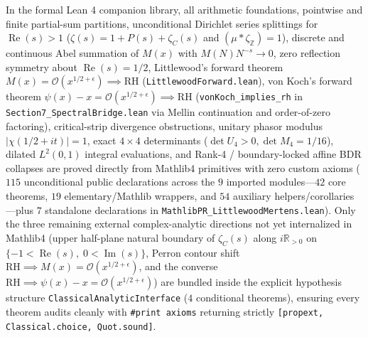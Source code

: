 \begin{remark}
\label{rem:lean_classical_interface}
\leanok
In the formal Lean 4 companion library, all arithmetic foundations, pointwise and finite partial-sum partitions, unconditional Dirichlet series splittings for $\operatorname{Re}(s) > 1$ ($\zeta(s) = 1 + P(s) + \zeta_C(s)$ and $(\mu * \zeta_{\mathbb{Z}}) = 1$), discrete and continuous Abel summation of $M(x)$ with $M(N)N^{-s} \to 0$, zero reflection symmetry about $\operatorname{Re}(s) = 1/2$, Littlewood's forward theorem $M(x) = \mathcal{O}(x^{1/2+\epsilon}) \implies \mathrm{RH}$ (\texttt{LittlewoodForward.lean}), von Koch's forward theorem $\psi(x) - x = \mathcal{O}(x^{1/2+\epsilon}) \implies \mathrm{RH}$ (\texttt{vonKoch\_implies\_rh} in \texttt{Section7\_SpectralBridge.lean} via Mellin continuation and order-of-zero factoring), critical-strip divergence obstructions, unitary phasor modulus $|\chi(1/2 + i t)| = 1$, exact $4 \times 4$ determinants ($\det U_4 > 0, \det M_4 = 1/16$), dilated $L^2(0,1)$ integral evaluations, and Rank-4 / boundary-locked affine BDR collapses are proved directly from Mathlib4 primitives with zero custom axioms ($115$ unconditional public declarations across the $9$ imported modules---$42$ core theorems, $19$ elementary/Mathlib wrappers, and $54$ auxiliary helpers/corollaries---plus $7$ standalone declarations in \texttt{MathlibPR\_LittlewoodMertens.lean}). Only the three remaining external complex-analytic directions not yet internalized in Mathlib4 (upper half-plane natural boundary of $\zeta_C(s)$ along $i\mathbb{R}_{>0}$ on $\{-1 < \operatorname{Re}(s),\; 0 < \operatorname{Im}(s)\}$, Perron contour shift $\mathrm{RH} \implies M(x) = \mathcal{O}(x^{1/2+\epsilon})$, and the converse $\mathrm{RH} \implies \psi(x) - x = \mathcal{O}(x^{1/2+\epsilon})$) are bundled inside the explicit hypothesis structure \texttt{ClassicalAnalyticInterface} ($4$ conditional theorems), ensuring every theorem audits cleanly with \texttt{\#print axioms} returning strictly \texttt{[propext, Classical.choice, Quot.sound]}.
\end{remark}


